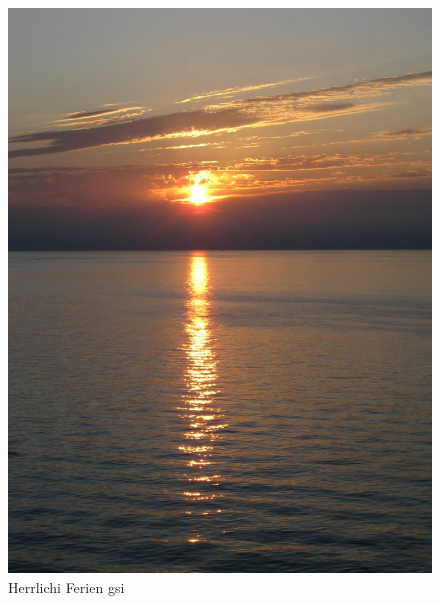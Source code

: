 \begin{figure}[H]
    \centering
    \includegraphics[width=\textwidth]{../Bilder/Korsika/54.jpg}
    \caption{Herrlichi Ferien gsi}
    \label{img:Korsika4}
\end{figure}
